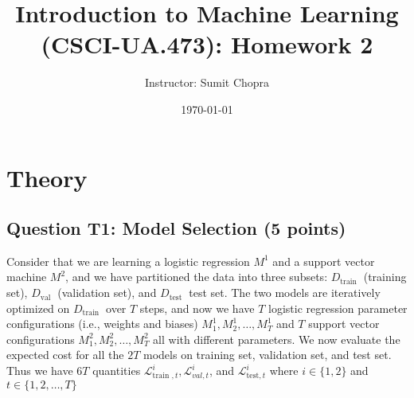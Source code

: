 \documentclass[10pt]{article}
\title{Introduction to Machine Learning (CSCI-UA.473): Homework 2 }
\author{Instructor: Sumit Chopra}
\date{\today}
\begin{document}
\maketitle


\section*{Theory}
\subsection*{Question T1: Model Selection (5 points)}
Consider that we are learning a logistic regression $M^{1}$ and a support vector machine $M^{2}$, and we have partitioned the data into three subsets: $D_{\text {train }}$ (training set), $D_{\text {val }}$ (validation set), and $D_{\text {test }}$ test set. The two models are iteratively optimized on $D_{\text {train }}$ over $T$ steps, and now we have $T$ logistic regression parameter configurations (i.e., weights and biases) $M_{1}^{1}, M_{2}^{1}, \ldots, M_{T}^{1}$ and $T$ support vector configurations $M_{1}^{2}, M_{2}^{2}, \ldots, M_{T}^{2}$ all with different parameters. We now evaluate the expected cost for all the $2 T$ models on training set, validation set, and test set. Thus we have $6 T$ quantities $\mathcal{L}_{\text {train }, t}^{i}, \mathcal{L}_{v a l, t}^{i}$, and $\mathcal{L}_{\text {test}, t}^{i}$ where $i \in\{1,2\}$ and $t \in\{1,2, \ldots, T\}$
\end{document}
